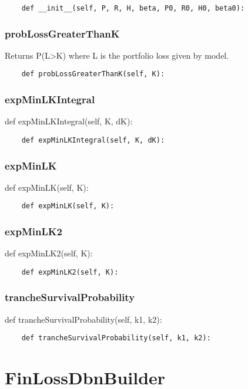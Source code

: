 \documentclass[twoside,11pt]{book}
\begin{document}
\begin{lstlisting}
    def __init__(self, P, R, H, beta, P0, R0, H0, beta0):
\end{lstlisting}

\subsubsection*{{\bf probLossGreaterThanK}}
Returns P(L>K) where L is the portfolio loss given by model.  

\begin{lstlisting}
    def probLossGreaterThanK(self, K):
\end{lstlisting}

\subsubsection*{{\bf expMinLKIntegral}}
def expMinLKIntegral(self, K, dK): 

\begin{lstlisting}
    def expMinLKIntegral(self, K, dK):
\end{lstlisting}

\subsubsection*{{\bf expMinLK}}
def expMinLK(self, K): 

\begin{lstlisting}
    def expMinLK(self, K):
\end{lstlisting}

\subsubsection*{{\bf expMinLK2}}
def expMinLK2(self, K): 

\begin{lstlisting}
    def expMinLK2(self, K):
\end{lstlisting}

\subsubsection*{{\bf trancheSurvivalProbability}}
def trancheSurvivalProbability(self, k1, k2): 

\begin{lstlisting}
    def trancheSurvivalProbability(self, k1, k2):
\end{lstlisting}

\newpage
\section{FinLossDbnBuilder}
\end{document}
